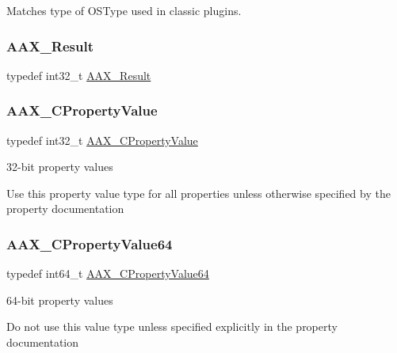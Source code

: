 Matches type of O\+S\+Type used in classic plugins. 

\mbox{\label{a00392_a4d8f69a697df7f70c3a8e9b8ee130d2f}} 
\subsubsection{\texorpdfstring{AAX\_Result}{AAX\_Result}}
{\footnotesize\ttfamily typedef int32\+\_\+t \mbox{\hyperlink{a00392_a4d8f69a697df7f70c3a8e9b8ee130d2f}{A\+A\+X\+\_\+\+Result}}}

\mbox{\label{a00392_ab247c0d8686c14e05cbb567ef276f249}} 
\subsubsection{\texorpdfstring{AAX\_CPropertyValue}{AAX\_CPropertyValue}}
{\footnotesize\ttfamily typedef int32\+\_\+t \mbox{\hyperlink{a00392_ab247c0d8686c14e05cbb567ef276f249}{A\+A\+X\+\_\+\+C\+Property\+Value}}}



32-\/bit property values 

Use this property value type for all properties unless otherwise specified by the property documentation \mbox{\label{a00392_a49471789032304f99ac1af8c15a87313}} 
\subsubsection{\texorpdfstring{AAX\_CPropertyValue64}{AAX\_CPropertyValue64}}
{\footnotesize\ttfamily typedef int64\+\_\+t \mbox{\hyperlink{a00392_a49471789032304f99ac1af8c15a87313}{A\+A\+X\+\_\+\+C\+Property\+Value64}}}



64-\/bit property values 

Do not use this value type unless specified explicitly in the property documentation \mbox{\label{a00392_a7abe263a7521e988ed4ee4ac691ed5f9}} 
